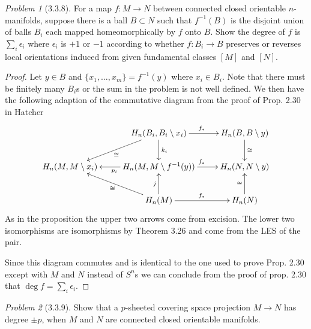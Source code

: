 \documentclass[10pt]{article}
\newcommand{\sk}{\vskip 10mm}
\theoremstyle{remark}
\newtheorem{problem}{Problem}
\begin{document}
\begin{problem}[3.3.8]
  For a map $f:M\rightarrow N$ between connected closed orientable
  $n$-manifolds, suppose there is a ball $B\subset N$ such that $f^{-1}(B)$ is
  the disjoint union of balls $B_i$ each mapped homeomorphically by $f$ onto
  $B$. Show the degree of $f$ is $\sum_i\epsilon_i$ where $\epsilon_i$ is
  $+1$ or $-1$ according to whether $f:B_i\rightarrow B$ preserves or reverses
  local orientations induced from given fundamental classes $[M]$ and $[N]$.
\end{problem}

\begin{proof}
  Let $y\in B$ and $\{x_1,\ldots,x_m\}=f^{-1}(y)$ where $x_i\in B_i$. Note that there must
  be finitely many $B_i$s or the sum in the problem is not well defined. We then
  have the following adaption of the commutative diagram from the proof of Prop. 2.30 in Hatcher
  \[
    \xymatrix{
      & H_n(B_i,B_i\setminus x_i) \ar[r]^{f_*} \ar[dl]^\cong \ar[d]^{k_i}& H_n(B,B\setminus y) \ar[d]^{\cong}\\
      H_n(M,M\setminus x_i) & H_n(M,M\setminus f^{-1}(y)) \ar[l]^{p_i} \ar[r]^{f_*} & H_n(N,N\setminus y)\\
      & H_n(M) \ar[ul]^{\cong} \ar[u]^j \ar[r]^{f_*} & H_n(N) \ar[u]^\cong \\
    }
  \]
  As in the proposition the upper two arrows come from excision. The lower
  two isomorphisms are isomorphisms by Theorem 3.26 and come from the LES of the
  pair.

  Since this diagram commutes and is identical to the one used to prove Prop. 2.30
  except with $M$ and $N$ instead of $S^n$s we can conclude from the proof of prop. 2.30
  that $\deg f= \sum_i \epsilon_i$.
\end{proof}

\sk

\begin{problem}[3.3.9]
  Show that a $p$-sheeted covering space projection $M\rightarrow N$ has
  degree $\pm p$, when $M$ and $N$ are connected closed orientable manifolds.
\end{problem}
\end{document}

